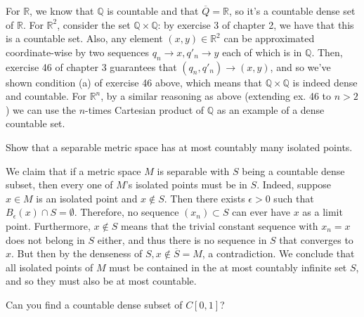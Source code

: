 \begin{solution}
    
    For $\mathbb{R}$, we know that $\mathbb{Q}$ is countable and that $\overline{Q} = \mathbb{R}$, so it's a countable dense set of $\mathbb{R}$.
    For $\mathbb{R}^2$, consider the set $\mathbb{Q} \times \mathbb{Q}$: by exercise 3 of chapter 2, we have that this is a countable set.
    Also, any element $(x, y) \in \mathbb{R}^2$ can be approximated coordinate-wise by two sequences $q_n \rightarrow x, q'_n \rightarrow y$ each of which is in $\mathbb{Q}$.
    Then, exercise 46 of chapter 3 guarantees that $(q_n, q'_n) \rightarrow (x, y)$, and so we've shown condition (a) of exercise 46 above, which means that $\mathbb{Q} \times \mathbb{Q}$ is indeed dense and countable.
    For $\mathbb{R}^n$, by a similar reasoning as above (extending ex. 46 to $n > 2$) we can use the $n$-times Cartesian product of $\mathbb{Q}$ as an example of a dense countable set.
\end{solution}

\begin{exercise}{51}
    Show that a separable metric space has at most countably many isolated points.
\end{exercise}

\begin{solution}
    
    We claim that if a metric space $M$ is separable with $S$ being a countable dense subset, then every one of $M$'s isolated points must be in $S$.
    Indeed, suppose $x \in M$ is an isolated point and $x \notin S$.
    Then there exists $\epsilon > 0$ such that $B_{\epsilon}(x) \cap S = \emptyset$.
    Therefore, no sequence $(x_n) \subset S$ can ever have $x$ as a limit point.
    Furthermore, $x \notin S$ means that the trivial constant sequence with $x_n = x$ does not belong in $S$ either, and thus there is no sequence in $S$ that converges to $x$.
    But then by the denseness of $S, x \notin \overline{S} = M$, a contradiction.
    We conclude that all isolated points of $M$ must be contained in the at most countably infinite set $S$, and so they must also be at most countable.
\end{solution}

\begin{exercise}{53}
    Can you find a countable dense subset of $C[0, 1]$?
\end{exercise}

